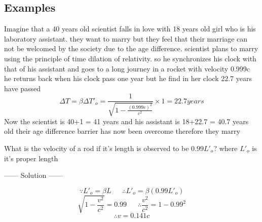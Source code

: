 \subsection{Examples}
\begin{example}
    Imagine that a 40 years old scientist falls in love with 18 years old girl who is his laboratory assistant.
    they want to marry but they feel that their marriage can not be welcomed by the society due to the age difference.
    scientist plans to marry using the principle of time dilation of relativity. so he synchronizes his clock with that of his assistant and goes to a long journey in a rocket with velocity 0.999c\\
    he returns back when his clock pass one year but he find in her clock 22.7 years have passed 
    \[
    \Delta T = \beta\Delta T'_o = \frac{1}{\sqrt{1-\frac{{(0.999c)}^2}{c^2}}} \times 1 = 22.7\si{years}
    \]
    Now the scientist is 40+1 = 41 years and his assistant is 18+22.7 = 40.7 years old their age difference barrier has now been overcome therefore they marry    
\end{example}
\begin{example}
    What is the velocity of a rod if it's length is observed to be $0.99L'_o$? where $L'_o$ is it's proper length
\begin{center}
    ------ \textcolor{Solution}{Solution} ------ 
\end{center}
\[
\because L'_o = \beta L \ \ \ \ \ \ \ \therefore L'_o = \beta(0.99L'_o)
\]
\[
\sqrt{1-\frac{v^2}{c^2}} = 0.99 \ \ \ \ \ \ \ \therefore \frac{v^2}{c^2} = 1-0.99^2
\]
\[
\therefore v = 0.141c
\]
\end{example}
